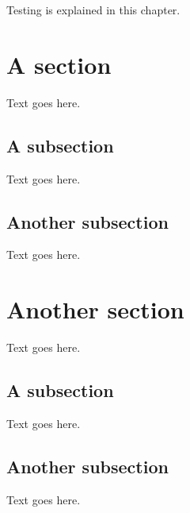 Testing is explained in this chapter.


\section{A section}
Text goes here.

\subsection{A subsection}
Text goes here.

\subsection{Another subsection}
Text goes here.

\section{Another section}
Text goes here.

\subsection{A subsection}
Text goes here.

\subsection{Another subsection}
Text goes here.
